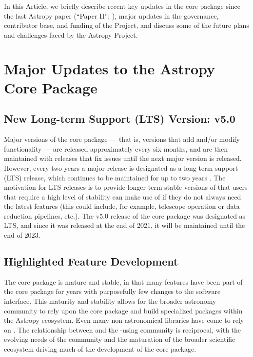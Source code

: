 \documentclass[modern]{aastex631}
\newcommand{\secauthor}[1]{{\color{blue}Author:~\textit{#1}}}
\begin{document}
In this Article, we briefly describe recent key updates in the \astropypkg core
package since the last Astropy paper (``Paper II''; \citealt{astropy:2018}),
major updates in the governance, contributor base, and funding of the Project,
and discuss some of the future plans and challenges faced by the Astropy
Project.


\section{Major Updates to the Astropy Core Package} \label{sec:core-updates}

\subsection{New Long-term Support (LTS) Version: v5.0} \label{sec:core-v50}


Major versions of the core package --- that is, versions that add and/or modify
functionality --- are released approximately every six months, and are then
maintained with releases that fix issues until the next major version is
released. However, every two years a major release is designated as a long-term
support (LTS) release, which continues to be maintained for up to two years
\citep{ape2}. The motivation for LTS releases is to provide longer-term stable
versions of \astropypkg that users that require a high level of stability can
make use of if they do not always need the latest features (this could include,
for example, telescope operation or data reduction pipelines, etc.). The v5.0
release of the core package was designated as LTS, and since it was released at
the end of 2021, it will be maintained until the end of 2023.


\subsection{Highlighted Feature Development} \label{sec:core-features}


The \astropypkg core package is mature and stable, in that many features have
been part of the core package for years with purposefully few changes to the
software interface. This maturity and stability allows for the broader
astronomy \python community to rely upon the \astropypkg core package and build
specialized packages within the Astropy ecosystem. Even many non-astronomical
\python libraries have come to rely on \astropypkg. The relationship between
\astropy and the \python-using community is reciprocal, with the evolving needs
of the community and the maturation of the broader scientific \python ecosystem
driving much of the development of the \astropypkg core package.
\end{document}
